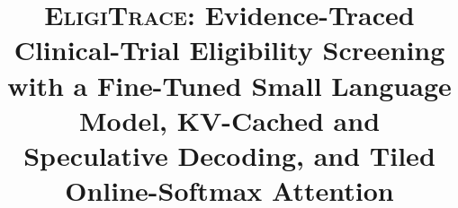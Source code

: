 \documentclass[conference]{IEEEtran}
\newcommand{\sys}{\textsc{EligiTrace}}
\begin{document}
\title{\sys: Evidence-Traced Clinical-Trial Eligibility Screening with a Fine-Tuned Small Language Model, KV-Cached and Speculative Decoding, and Tiled Online-Softmax Attention}

\author{
}

\maketitle













\appendices

\end{document}
